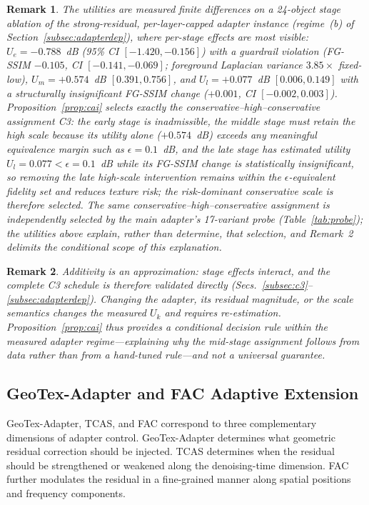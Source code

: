 \documentclass[times,twocolumn,final]{elsarticle}
\newtheorem{remark}{Remark}
\begin{document}
\begin{remark}
The utilities are measured finite differences on a 24-object stage ablation of the strong-residual, per-layer-capped adapter instance (regime~(b) of Section~\ref{subsec:adapterdep}), where per-stage effects are most visible: $U_e=-0.788$~dB (95\% CI $[-1.420,-0.156]$) with a guardrail violation (FG-SSIM $-0.105$, CI $[-0.141,-0.069]$; foreground Laplacian variance $3.85\times$ fixed-low), $U_m=+0.574$~dB $[0.391,0.756]$, and $U_l=+0.077$~dB $[0.006,0.149]$ with a structurally insignificant FG-SSIM change ($+0.001$, CI $[-0.002,0.003]$). Proposition~\ref{prop:cai} selects exactly the conservative--high--conservative assignment C3: the early stage is inadmissible, the middle stage must retain the high scale because its utility alone ($+0.574$~dB) exceeds any meaningful equivalence margin such as $\epsilon=0.1$~dB, and the late stage has estimated utility $U_l=0.077<\epsilon=0.1$~dB while its FG-SSIM change is statistically insignificant, so removing the late high-scale intervention remains within the $\epsilon$-equivalent fidelity set and reduces texture risk; the risk-dominant conservative scale is therefore selected. The same conservative--high--conservative assignment is independently selected by the main adapter's 17-variant probe (Table~\ref{tab:probe}); the utilities above explain, rather than determine, that selection, and Remark~2 delimits the conditional scope of this explanation.
\end{remark}

\begin{remark}
Additivity is an approximation: stage effects interact, and the complete C3 schedule is therefore validated directly (Secs.~\ref{subsec:c3}--\ref{subsec:adapterdep}). Changing the adapter, its residual magnitude, or the scale semantics changes the measured $U_k$ and requires re-estimation. Proposition~\ref{prop:cai} thus provides a conditional decision rule within the measured adapter regime---explaining why the mid-stage assignment follows from data rather than from a hand-tuned rule---and not a universal guarantee.
\end{remark}

\subsection{GeoTex-Adapter and FAC Adaptive Extension}
\label{subsec:fac}

GeoTex-Adapter, TCAS, and FAC correspond to three complementary dimensions of adapter control. GeoTex-Adapter determines what geometric residual correction should be injected. TCAS determines when the residual should be strengthened or weakened along the denoising-time dimension. FAC further modulates the residual in a fine-grained manner along spatial positions and frequency components.
\end{document}
